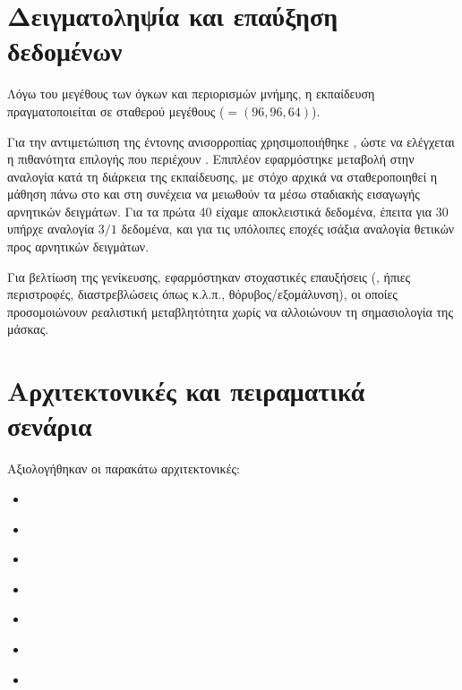 \section{Δειγματοληψία  και επαύξηση δεδομένων}
\label{sec:proto_patches_aug}

Λόγω του μεγέθους των  όγκων και περιορισμών μνήμης, η εκπαίδευση
πραγματοποιείται σε  σταθερού μεγέθους ($=(96,96,64)$).

Για την αντιμετώπιση της έντονης ανισορροπίας 
χρησιμοποιή\-θηκε , ώστε να ελέγχεται η πιθανότητα
επιλογής  που περιέχουν . Επιπλέον εφαρμόστηκε μεταβολή στην αναλογία
 κατά τη διάρκεια της εκπαίδευσης, με στόχο αρχικά να
σταθεροποιηθεί η μάθηση πάνω στο  και στη συνέχεια να
μειωθούν τα  μέσω σταδιακής εισαγωγής αρνητικών
δειγμά\-των. Για τα πρώτα 40  είχαμε αποκλειστικά  
δεδομένα, έπειτα για 30  υπήρχε αναλογία $3/1$  δεδομένα, 
και για τις υπόλοιπες εποχές ισάξια αναλογία θετικών προς αρνητικών δειγμάτων. 

Για βελτίωση της γενίκευσης, εφαρμόστηκαν στοχαστικές επαυξήσεις
(, ήπιες περιστροφές, διαστρεβλώσεις όπως  κ.λ.π., 
θόρυβος/εξομάλυνση), οι οποίες προσομοιώνουν ρεαλιστική μεταβλητότητα χωρίς
να αλλοιώνουν τη σημασιολογία της μάσκας.

\section{Αρχιτεκτονικές και πειραματικά σενάρια}
\label{sec:exp_models}

Αξιολογήθηκαν οι παρακάτω αρχιτεκτονικές:
\begin{itemize}
  \item {} \cite{ronneberger2015unet}
  \item {} \cite{oktay2018attentionunet}
  \item {} \cite{isensee2021nnunet}
  \item {} \cite{hatamizadeh2022unetr}
  \item {} \cite{hatamizadeh2022swinunetr}
  \item {} \cite{myronenko2018segresnet}
  \item {} \cite{xing2024segmamba}
\end{itemize}

